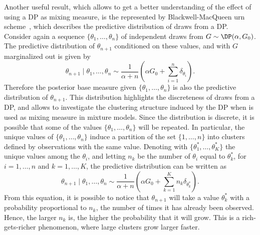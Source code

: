 Another useful result, which allows to get a better understanding of the effect of using a DP as mixing measure, is the represented by Blackwell-MacQueen urn scheme~\parencite{blackwell1973}, which describes the predictive distribution of draws from a DP. Consider again a sequence $\{\theta_1,\dots,\theta_n\}$ of independent draws from $G\sim\DP(\alpha,G_0)$. The predictive distribution of $\theta_{n+1}$ conditioned on these values, and with $G$ marginalized out is given by 
\begin{equation*}
\theta_{n+1} \mid \theta_1,\dots,\theta_n \sim \frac{1}{\alpha + n} \left( \alpha G_0 + \sum_{i=1}^n \delta_{\theta_i} \right).
\end{equation*}
Therefore the posterior base measure given $\{\theta_1,\dots,\theta_n\}$ is also the predictive distribution of $\theta_{n+1}$. This distribution highlights the discreteness of draws from a DP, and allows to investigate the clustering structure induced by the DP when is used as mixing measure in mixture models. Since the distribution is discrete, it is possible that some of the values $\{\theta_1,\dots,\theta_n\}$ will be repeated. In particular, the unique values of $\{\theta_1,\dots,\theta_n\}$ induce
a partition of the set $\{1,\dots,n\}$ into clusters defined by observations with the same value.
Denoting with $\{\theta^*_1, \dots, \theta^*_K\}$ the unique values among the $\theta_i$, and letting $n_k$ be the number of $\theta_i$ equal to $\theta^*_k$, for $i=1,\dots,n$ and $k=1,\dots,K$, the predictive distribution can be written as
\begin{equation*}
\theta_{n+1} \mid \theta_1,\dots,\theta_n \sim \frac{1}{\alpha + n} \left( \alpha G_0 + \sum_{k=1}^K n_k \delta_{\theta_k^*} \right).
\end{equation*}
From this equation, it is possible to notice that $\theta_{n+1}$ will take a value $\theta^*_k$ with a probability proportional to $n_k$, the number of times it has already been observed. 
Hence, the larger $n_k$ is, the higher the probability that it will grow. This is a rich-gets-richer phenomenon, where large clusters grow larger faster.


